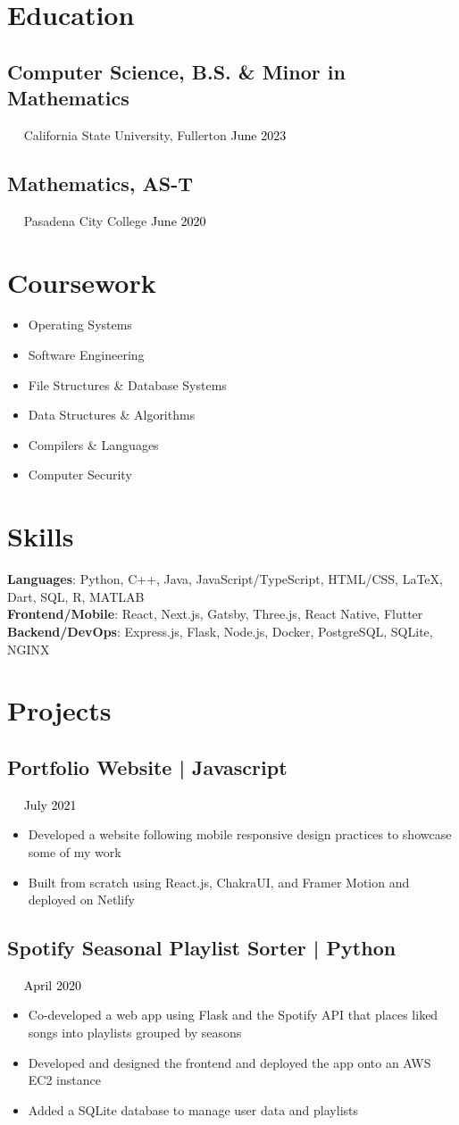 \documentclass{article}
\newcommand{\resumesection}[3]{
    \subsection*{#1}
    \ 
    \ 
    \small
    \textcolor{csufgrey}{#2}
    \normalsize
    \hfill
    \textcolor{black}{#3}
    \normalsize
}
\begin{document}
\pagestyle{useheader}

\section*{Education}
\resumesection{Computer Science, B.S. \& Minor in Mathematics}{California State University, Fullerton}{June 2023}%
\resumesection{Mathematics, AS-T}{Pasadena City College}{June 2020}
\section*{Coursework}
\setlength{\multicolsep}{0pt}
\begin{multicols}{2}
    \noindent
    \begin{itemize}
        \item Operating Systems
        \item Software Engineering
        \item File Structures \& Database Systems
        \item Data Structures \& Algorithms
        \item Compilers \& Languages
        \item Computer Security
    \end{itemize}
\end{multicols}
\hfill
\section*{Skills}
\textbf{Languages}: Python, C++, Java, JavaScript/TypeScript, HTML/CSS, {\selectfont\LaTeX}, Dart, SQL, R, MATLAB\\
\textbf{Frontend/Mobile}: React, Next.js, Gatsby, Three.js, React Native, Flutter\\
\textbf{Backend/DevOps}: Express.js, Flask, Node.js, Docker, PostgreSQL, SQLite, NGINX\\
\section*{Projects}
\resumesection{Portfolio Website | Javascript}{}{July 2021}
\begin{itemize}
    \item Developed a website following mobile responsive design practices to showcase some of my work
    \item Built from scratch using React.js, ChakraUI, and Framer Motion and deployed on Netlify
\end{itemize}
\resumesection{Spotify Seasonal Playlist Sorter | Python}{}{April 2020}
\begin{itemize}
    \item Co-developed a web app using Flask and the Spotify API that places liked songs into playlists grouped by seasons
    \item Developed and designed the frontend and deployed the app onto an AWS EC2 instance
    \item Added a SQLite database to manage user data and playlists
\end{itemize}
\end{document}

